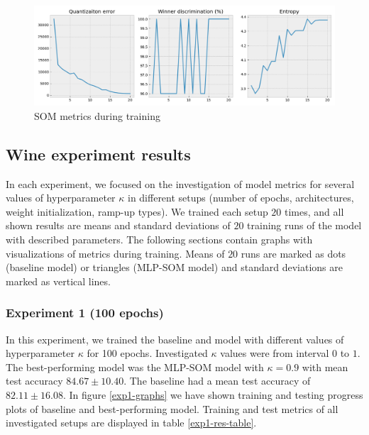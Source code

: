 \begin{figure}[h!]
    \centering
    \includegraphics[width=1\textwidth]{figs/som-stats.png}
    \caption{SOM metrics during training}
    \label{fig:som-metrices}
\end{figure}


\subsection{Wine experiment results}

In each experiment, we focused on the investigation of model metrics for several values of hyperparameter $\kappa$ in different setups (number of epochs, architectures, weight initialization, ramp-up types). We trained each setup $20$ times, and all shown results are means and standard deviations of $20$ training runs of the model with described parameters. The following sections contain graphs with visualizations of metrics during training. Means of $20$ runs are marked as dots (baseline model) or triangles (MLP-SOM model) and standard deviations are marked as vertical lines. 

\subsubsection{Experiment 1 (100 epochs)}

In this experiment, we trained the baseline and model with different values of hyperparameter $\kappa$ for 100 epochs. Investigated $\kappa$ values were from interval $0$ to $1$. The best-performing model was the MLP-SOM model with $\kappa = 0.9$ with mean test accuracy $84.67 \pm 10.40$. The baseline had a mean test accuracy of $82.11	\pm 16.08$. In figure \ref{exp1-graphs} we have shown training and testing progress plots of baseline and best-performing model. Training and test metrics of all investigated setups are displayed in table \ref{exp1-res-table}.


